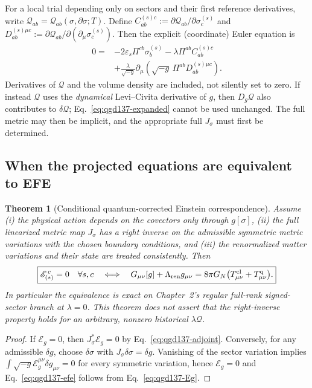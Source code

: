 \documentclass[11pt,a4paper]{article}
\newtheorem{theorem}{Theorem}[section]
\begin{document}
For a local trial depending only on sectors and their first
reference derivatives, write
$\mathcal Q_{ab}=\mathcal Q_{ab}(\sigma,\partial\sigma;T)$.
Define
$C_{ab}^{(s)c}:=\partial\mathcal Q_{ab}/\partial\sigma_c^{(s)}$
and
$D_{ab}^{(s)\mu c}:=\partial\mathcal Q_{ab}/\partial(\partial_\mu\sigma_c^{(s)})$.
Then the explicit (coordinate) Euler equation is
\begin{equation}\label{eq:qgd137-expanded}
\boxed{\begin{aligned}
0={}&-2\varepsilon_s\Pi^{cb}\sigma_b^{(s)}
-\lambda\Pi^{ab}C_{ab}^{(s)c}\\
&+\frac{\lambda}{\sqrt{-g}}\partial_\mu
\left(\sqrt{-g}\,\Pi^{ab}D_{ab}^{(s)\mu c}\right).
\end{aligned}}
\end{equation}
Derivatives of $\mathcal Q$ and the volume density are included,
not silently set to zero. If instead $\mathcal Q$ uses the
\emph{dynamical} Levi--Civita derivative of $g$, then
$D_g\mathcal Q$ also contributes to $\delta\mathcal Q$;
Eq.~\eqref{eq:qgd137-expanded} cannot be used unchanged.
The full metric may then be implicit, and the appropriate full
$J_\sigma$ must first be determined.

\subsection{When the projected equations are equivalent to EFE}
\begin{theorem}[Conditional quantum-corrected Einstein correspondence]
\label{thm:qgd137-efe}
Assume (i) the physical action depends on the covectors only through
$g[\sigma]$, (ii) the full linearized metric map $J_\sigma$ has a
right inverse on the admissible symmetric metric variations with the
chosen boundary conditions, and (iii) the renormalized matter
variations and their state are treated consistently. Then
\begin{equation}\label{eq:qgd137-efe}
\boxed{\mathscr E_{(s)}^{\,c}=0\quad\forall s,c
\quad\Longleftrightarrow\quad
G_{\mu\nu}[g]+\Lambda_{\rm ren}g_{\mu\nu}
=8\pi G_N\bigl(T^{\rm cl}_{\mu\nu}+T^{\rm q}_{\mu\nu}\bigr).}
\end{equation}
In particular the equivalence is exact on Chapter~2's regular
full-rank signed-sector branch at $\lambda=0$. This theorem does
not assert that the right-inverse property holds for an arbitrary,
nonzero historical $\lambda\mathcal Q$.
\end{theorem}
\begin{proof}
If $\mathcal E_g=0$, then $J_\sigma^*\mathcal E_g=0$ by
Eq.~\eqref{eq:qgd137-adjoint}. Conversely, for any admissible
$\delta g$, choose $\delta\sigma$ with
$J_\sigma\delta\sigma=\delta g$. Vanishing of the sector
variation implies $\int\sqrt{-g}\mathcal E_g^{\mu\nu}\delta g_{\mu\nu}=0$
for every symmetric variation, hence $\mathcal E_g=0$ and
Eq.~\eqref{eq:qgd137-efe} follows from Eq.~\eqref{eq:qgd137-Eg}.
\end{proof}
\end{document}

